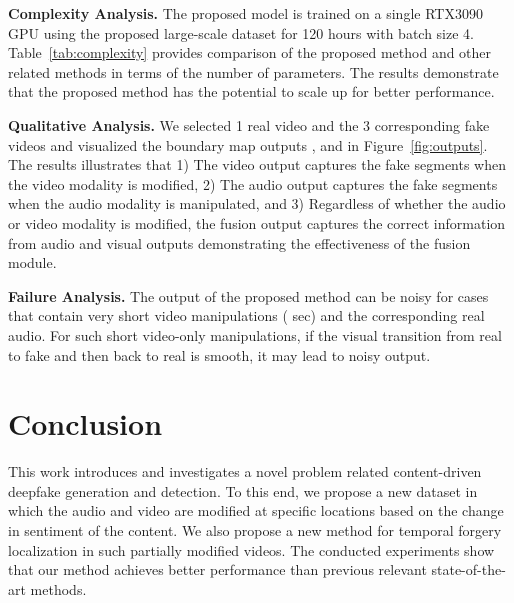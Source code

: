 \documentclass[conference, a4paper]{IEEEtran}
\begin{document}
\noindent \textbf{Complexity Analysis.} The proposed model is trained on a single RTX3090 GPU using the proposed large-scale dataset for 120 hours with batch size 4. Table~\ref{tab:complexity} provides comparison of the proposed method and other related methods in terms of the number of parameters. The results demonstrate that the proposed method has the potential to scale up for better performance.

\begin{table}[t]
\centering
\caption{\textbf{Method comparison in terms of number of parameters.} \textit{\modelabbr{}: the proposed method.}}
\label{tab:complexity}
\end{table}

\noindent \textbf{Qualitative Analysis.} We selected 1 real video and the 3 corresponding fake videos and visualized the boundary map outputs ,  and  in Figure~\ref{fig:outputs}. The results illustrates that 1) The video output captures the fake segments when the video modality is modified, 2) The audio output captures the fake segments when the audio modality is manipulated, and 3) Regardless of whether the audio or video modality is modified, the fusion output captures the correct information from audio and visual outputs demonstrating the effectiveness of the fusion module.

\noindent \textbf{Failure Analysis.} The output of the proposed method can be noisy for cases that contain very short video manipulations ( sec) and the corresponding real audio. For such short video-only manipulations, if the visual transition from real to fake and then back to real is smooth, it may lead to noisy output.

\section{Conclusion} This work introduces and investigates a novel problem related content-driven deepfake generation and detection. To this end, we propose a new dataset in which the audio and video are modified at specific locations based on the change in sentiment of the content. We also propose a new method for temporal forgery localization in such partially modified videos. The conducted experiments show that our method achieves better performance than previous relevant state-of-the-art methods.
\end{document}
